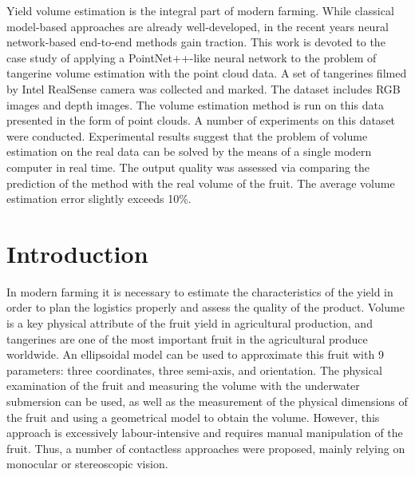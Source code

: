 \begin{thebibliography}{12}

Yield volume estimation is the integral part of modern farming.
While classical model-based approaches are already well-developed, in the recent years neural network-based end-to-end methods gain traction.
This work is devoted to the case study of applying a PointNet++-like neural network to the problem of tangerine volume estimation with the point cloud data.
A set of tangerines filmed by Intel RealSense camera was collected and marked.
The dataset includes RGB images and depth images.
The volume estimation method is run on this data presented in the form of point clouds.
A number of experiments on this dataset were conducted.
Experimental results suggest that the problem of volume estimation on the real data can be solved by the means of a single modern computer in real time.
The output quality was assessed via comparing the prediction of the method with the real volume of the fruit.
The average volume estimation error slightly exceeds 10\%.

\section{Introduction}

In modern farming it is necessary to estimate the characteristics of the yield in order to plan the logistics properly and assess the quality of the product.
Volume is a key physical attribute of the fruit yield in agricultural production, and tangerines are one of the most important fruit in the agricultural produce worldwide\cite{li2025metafruit}.
An ellipsoidal model can be used to approximate this fruit with 9 parameters: three coordinates, three semi-axis, and orientation.
The physical examination of the fruit and measuring the volume with the underwater submersion can be used, as well as the measurement of the physical dimensions of the fruit and using a geometrical model to obtain the volume.
However, this approach is excessively labour-intensive and requires manual manipulation of the fruit.
Thus, a number of contactless approaches were proposed, mainly relying on monocular or stereoscopic vision.


\end{thebibliography}
